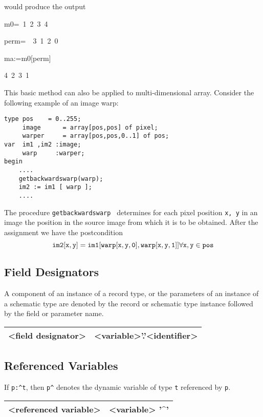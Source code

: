 {would produce the output 

\begin{lyxcode}
m0=~1~2~3~4

perm=~~3~1~2~0~

ma:=m0{[}perm{]}~

4~2~3~1
\end{lyxcode}

This basic method can also be applied to multi-dimensional array. Consider the
following example of an image warp:
\begin{verbatim}
type pos 	= 0..255;
     image      = array[pos,pos] of pixel;
     warper     = array[pos,pos,0..1] of pos;
var  im1 ,im2 :image;
     warp     :warper;
begin
    ....
    getbackwardswarp(warp);
    im2 := im1 [ warp ];
    ....
\end{verbatim}
The procedure {\tt getbackwardswarp } determines for each pixel position {\tt x, y} in an
image the position in the source image from which it is to be obtained.
After the assignment we have the postcondition $${\tt im2[x,y]}=
{\tt im1[warp[x,y,0],warp[x,y,1]]} \forall { \tt x,y} \in {\tt pos}$$
\subsection{Field Designators}

A component of an instance of a record type, or the parameters of an instance
of a schematic type are denoted by the record or schematic type instance followed
by the field or parameter name.

\vspace{0.3cm}
{\centering \begin{tabular}{|c|c|}
\hline 
<field designator>&
<variable>'.'<identifier>\\
\hline 
\end{tabular}\par}
\vspace{0.3cm}


\subsection{Referenced Variables}

If \texttt{p:\textasciicircum{}t}, then \texttt{p\textasciicircum{}} denotes
the dynamic variable of type \texttt{t} referenced by \texttt{p}.

\vspace{0.3cm}
{\centering \begin{tabular}{|c|c|}
\hline 
<referenced variable>&
<variable> '\textasciicircum{}'\\
\hline 
\end{tabular}\par}
\vspace{0.3cm}


}

